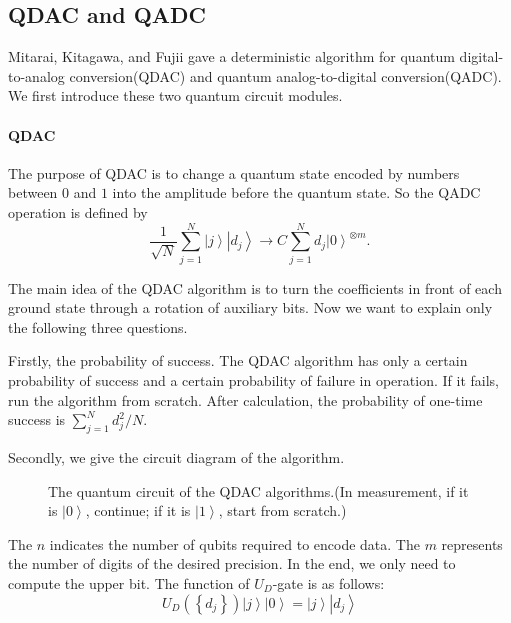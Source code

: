 \documentclass[%
 reprint,
 amsmath,amssymb,
pra,
]{revtex4-1}
\begin{document}
\subsection{QDAC and QADC}
Mitarai, Kitagawa, and Fujii \cite{mitarai2019quantum} gave a deterministic algorithm for quantum digital-to-analog conversion(QDAC) and quantum analog-to-digital conversion(QADC). We first introduce these two quantum circuit modules.
\paragraph{QDAC}

The purpose of QDAC is to change a quantum state encoded by numbers between $0$ and $1$ into the amplitude before the quantum state. So the QADC operation is defined by
\[\frac{1}{{\sqrt N }}\sum\limits_{j = 1}^N {\left| j \right\rangle \left| {{d_j}} \right\rangle  \to C\sum\limits_{j = 1}^N {{d_j}{{\left| 0 \right\rangle }^{ \otimes m}}} }. \]

The main idea of the QDAC algorithm is to turn the coefficients in front of each ground state through a rotation of auxiliary bits. Now we want to explain only the following three questions.

Firstly, the probability of success. The QDAC algorithm has only a certain probability of success and a certain probability of failure in operation. If it fails, run the algorithm from scratch. After calculation, the probability of one-time success is $\sum\nolimits_{j = 1}^N {d_j^2/N} $\cite{mitarai2019quantum}.

Secondly, we give the circuit diagram of the algorithm.

\begin{figure}[htbp]
  \caption{The quantum circuit of the QDAC algorithms.(In measurement, if it is $\left| 0 \right\rangle $, continue; if it is $\left| 1 \right\rangle $, start from scratch.)}
 \label{QDAC_qcir}
\end{figure}

The $n$ indicates the number of qubits required to encode data. The $m$ represents the number of digits of the desired precision. In the end, we only need to compute the upper bit. The function of ${U_D}$-gate is as follows:
\[{U_D}\left( {\left\{ {{d_j}} \right\}} \right)\left| j \right\rangle \left| 0 \right\rangle  = \left| j \right\rangle \left| {{d_j}} \right\rangle \]
\end{document}
